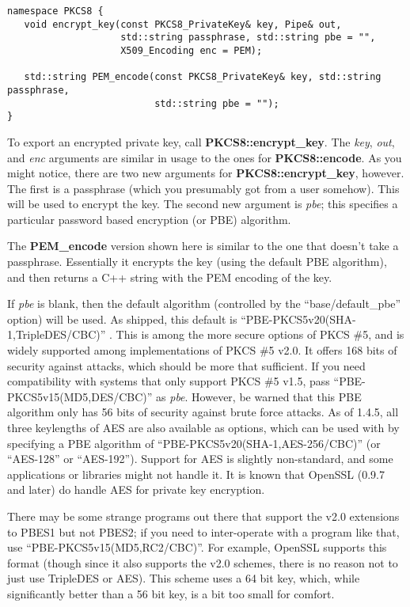 \documentclass{article}
\newcommand{\function}[1]{\textbf{#1}}
\renewcommand{\arg}[1]{\textsl{#1}}
\begin{document}
\begin{verbatim}
namespace PKCS8 {
   void encrypt_key(const PKCS8_PrivateKey& key, Pipe& out,
                    std::string passphrase, std::string pbe = "",
                    X509_Encoding enc = PEM);

   std::string PEM_encode(const PKCS8_PrivateKey& key, std::string passphrase,
                          std::string pbe = "");
}
\end{verbatim}

To export an encrypted private key, call \function{PKCS8::encrypt\_key}. The
\arg{key}, \arg{out}, and \arg{enc} arguments are similar in usage to the ones
for \function{PKCS8::encode}. As you might notice, there are two new arguments
for \function{PKCS8::encrypt\_key}, however. The first is a passphrase (which
you presumably got from a user somehow). This will be used to encrypt the key.
The second new argument is \arg{pbe}; this specifies a particular password
based encryption (or PBE) algorithm.

The \function{PEM\_encode} version shown here is similar to the one that
doesn't take a passphrase. Essentially it encrypts the key (using the default
PBE algorithm), and then returns a C++ string with the PEM encoding of the key.

If \arg{pbe} is blank, then the default algorithm (controlled by the
``base/default\_pbe'' option) will be used. As shipped, this default is
``PBE-PKCS5v20(SHA-1,TripleDES/CBC)'' . This is among the more secure options
of PKCS \#5, and is widely supported among implementations of PKCS \#5 v2.0. It
offers 168 bits of security against attacks, which should be more that
sufficient. If you need compatibility with systems that only support PKCS \#5
v1.5, pass ``PBE-PKCS5v15(MD5,DES/CBC)'' as \arg{pbe}. However, be warned that
this PBE algorithm only has 56 bits of security against brute force attacks. As
of 1.4.5, all three keylengths of AES are also available as options, which can
be used with by specifying a PBE algorithm of
``PBE-PKCS5v20(SHA-1,AES-256/CBC)'' (or ``AES-128'' or ``AES-192''). Support
for AES is slightly non-standard, and some applications or libraries might not
handle it. It is known that OpenSSL (0.9.7 and later) do handle AES for private
key encryption.

There may be some strange programs out there that support the v2.0 extensions
to PBES1 but not PBES2; if you need to inter-operate with a program like that,
use ``PBE-PKCS5v15(MD5,RC2/CBC)''. For example, OpenSSL supports this format
(though since it also supports the v2.0 schemes, there is no reason not to just
use TripleDES or AES). This scheme uses a 64 bit key, which, while
significantly better than a 56 bit key, is a bit too small for comfort.
\end{document}
